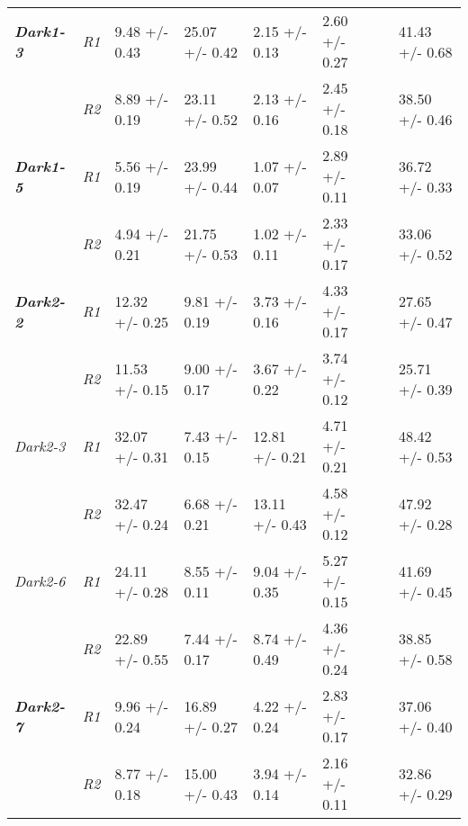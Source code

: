 \begin{table}[h!]
{\begin{tabular}{|l||l|l|l|l|l|l|l|}
         \textbf{\textit{Dark1-3}}     & \textit{R1}          & 9.48 +/- 0.43      & 25.07 +/- 0.42    & 2.15 +/- 0.13      & 2.60 +/- 0.27          &  & 41.43 +/- 0.68      \\ 
                              & \textit{R2}                   & 8.89 +/- 0.19      & 23.11 +/- 0.52    & 2.13 +/- 0.16      & 2.45 +/- 0.18          &  & 38.50 +/- 0.46      \\
         \textbf{\textit{Dark1-5}}     & \textit{R1}          & 5.56 +/- 0.19      & 23.99 +/- 0.44    & 1.07 +/- 0.07      & 2.89 +/- 0.11          &  & 36.72 +/- 0.33      \\ 
                              & \textit{R2}                   & 4.94 +/- 0.21      & 21.75 +/- 0.53    & 1.02 +/- 0.11      & 2.33 +/- 0.17          &  & 33.06 +/- 0.52      \\
         \textbf{\textit{Dark2-2}}     & \textit{R1}          & 12.32 +/- 0.25     & 9.81 +/- 0.19     & 3.73 +/- 0.16      & 4.33 +/- 0.17          &  & 27.65 +/- 0.47      \\ 
                              & \textit{R2}                   & 11.53 +/- 0.15     & 9.00 +/- 0.17     & 3.67 +/- 0.22      & 3.74 +/- 0.12          &  & 25.71 +/- 0.39      \\
         \textit{Dark2-3}     & \textit{R1}                   & 32.07 +/- 0.31     & 7.43 +/- 0.15     & 12.81 +/- 0.21     & 4.71 +/- 0.21          &  & 48.42 +/- 0.53      \\ 
                              & \textit{R2}                   & 32.47 +/- 0.24     & 6.68 +/- 0.21     & 13.11 +/- 0.43     & 4.58 +/- 0.12          &  & 47.92 +/- 0.28      \\
         \textit{Dark2-6}     & \textit{R1}                   & 24.11 +/- 0.28     & 8.55 +/- 0.11     & 9.04 +/- 0.35      & 5.27 +/- 0.15          &  & 41.69 +/- 0.45      \\ 
                              & \textit{R2}                   & 22.89 +/- 0.55     & 7.44 +/- 0.17     & 8.74 +/- 0.49      & 4.36 +/- 0.24          &  & 38.85 +/- 0.58      \\
         \textbf{\textit{Dark2-7}}     & \textit{R1}          & 9.96 +/- 0.24      & 16.89 +/- 0.27    & 4.22 +/- 0.24      & 2.83 +/- 0.17          &  & 37.06 +/- 0.40      \\ 
                              & \textit{R2}                   & 8.77 +/- 0.18      & 15.00 +/- 0.43    & 3.94 +/- 0.14      & 2.16 +/- 0.11          &  & 32.86 +/- 0.29      \\

\end{tabular}}
\end{table}
